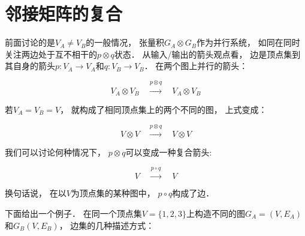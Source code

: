 \documentclass[10pt, openany]{book}
\begin{document}
\section{邻接矩阵的复合}

前面讨论的是$V_A \neq V_B$的一般情况，
张量积$G_A \otimes G_B$作为并行系统，
如同在同时关注两边处于互不相干的$p \otimes q$状态．
从输入/输出的箭头观点看，
边是顶点集到其自身的箭头$p:V_A \to V_A$和$q:V_B \to V_B$．
在两个图上并行的箭头：

$$
V_A \otimes V_B \stackrel{p \otimes q}{\xrightarrow{\hspace{2cm}}} V_A \otimes V_B
$$

若$V_A = V_B = V$，
就构成了相同顶点集上的两个不同的图，
上式变成：

$$
V \otimes V \stackrel{p \otimes q}{\xrightarrow{\hspace{2cm}}} V \otimes V
$$

我们可以讨论何种情况下，
$p \otimes q$可以变成一种复合箭头:

$$
V \stackrel{p \circ q}{\xrightarrow{\hspace{2cm}}} V
$$

换句话说，
在以$V$为顶点集的某种图中，
$p \circ q$构成了边．

下面给出一个例子．
在同一个顶点集$V = \{1,2,3\}$上构造不同的图$G_A=(V,E_A)$和$G_B(V,E_B)$，
边集的几种描述方式：
\end{document}
